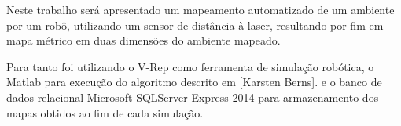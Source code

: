 % 
% 
%
Neste trabalho ser\'{a} apresentado um mapeamento automatizado  de um ambiente por um rob\^{o}, utilizando um sensor de dist\^{a}ncia \`{a} laser, resultando por fim em mapa m\'{e}trico em duas dimens\~{o}es do ambiente mapeado.
\par
Para tanto foi utilizando o V-Rep como ferramenta de simula\c{c}\~{a}o rob\'{o}tica, o Matlab para execu\c{c}\~{a}o do algoritmo descrito em [Karsten Berns]. e o banco de dados relacional Microsoft SQLServer Express 2014 para armazenamento dos mapas obtidos ao fim de cada simula\c{c}\~{a}o.